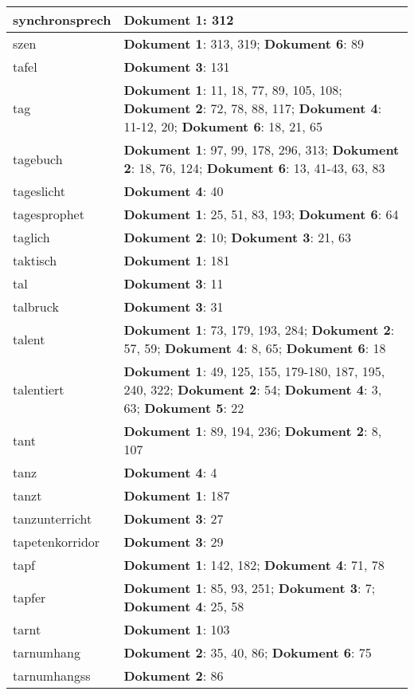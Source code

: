 \documentclass[a5paper]{article}
\begin{document}
\begin{longtable}[l]{|l|p{3in}|}
\hline
synchronsprech & \textbf{Dokument 1}: 312 \\
\hline
szen & \textbf{Dokument 1}: 313, 319; \textbf{Dokument 6}: 89 \\
\hline
tafel & \textbf{Dokument 3}: 131 \\
\hline
tag & \textbf{Dokument 1}: 11, 18, 77, 89, 105, 108; \textbf{Dokument 2}: 72, 78, 88, 117; \textbf{Dokument 4}: 11-12, 20; \textbf{Dokument 6}: 18, 21, 65 \\
\hline
tagebuch & \textbf{Dokument 1}: 97, 99, 178, 296, 313; \textbf{Dokument 2}: 18, 76, 124; \textbf{Dokument 6}: 13, 41-43, 63, 83 \\
\hline
tageslicht & \textbf{Dokument 4}: 40 \\
\hline
tagesprophet & \textbf{Dokument 1}: 25, 51, 83, 193; \textbf{Dokument 6}: 64 \\
\hline
taglich & \textbf{Dokument 2}: 10; \textbf{Dokument 3}: 21, 63 \\
\hline
taktisch & \textbf{Dokument 1}: 181 \\
\hline
tal & \textbf{Dokument 3}: 11 \\
\hline
talbruck & \textbf{Dokument 3}: 31 \\
\hline
talent & \textbf{Dokument 1}: 73, 179, 193, 284; \textbf{Dokument 2}: 57, 59; \textbf{Dokument 4}: 8, 65; \textbf{Dokument 6}: 18 \\
\hline
talentiert & \textbf{Dokument 1}: 49, 125, 155, 179-180, 187, 195, 240, 322; \textbf{Dokument 2}: 54; \textbf{Dokument 4}: 3, 63; \textbf{Dokument 5}: 22 \\
\hline
tant & \textbf{Dokument 1}: 89, 194, 236; \textbf{Dokument 2}: 8, 107 \\
\hline
tanz & \textbf{Dokument 4}: 4 \\
\hline
tanzt & \textbf{Dokument 1}: 187 \\
\hline
tanzunterricht & \textbf{Dokument 3}: 27 \\
\hline
tapetenkorridor & \textbf{Dokument 3}: 29 \\
\hline
tapf & \textbf{Dokument 1}: 142, 182; \textbf{Dokument 4}: 71, 78 \\
\hline
tapfer & \textbf{Dokument 1}: 85, 93, 251; \textbf{Dokument 3}: 7; \textbf{Dokument 4}: 25, 58 \\
\hline
tarnt & \textbf{Dokument 1}: 103 \\
\hline
tarnumhang & \textbf{Dokument 2}: 35, 40, 86; \textbf{Dokument 6}: 75 \\
\hline
tarnumhangss & \textbf{Dokument 2}: 86 \\

\end{longtable}
\end{document}
